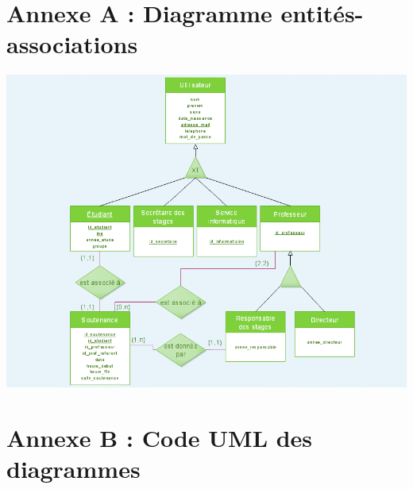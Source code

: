 \documentclass[11pt, a4paper]{report}
\begin{document}
\newpage

\appendix
\chapter*{Annexe A : Diagramme entités-associations}
\begin{center}
\includegraphics[scale=0.5]{Images/diagentiassoc.png}
\end{center}

\newpage

\chapter*{Annexe B : Code UML des diagrammes}
\end{document}
